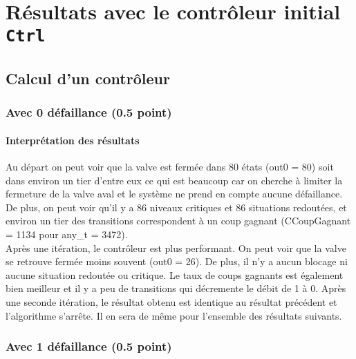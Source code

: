 \documentclass[a4paper]{book}
\begin{document}
\section{Résultats avec le contrôleur initial {\tt Ctrl}}
\subsection{Calcul d'un contrôleur}
\subsubsection{Avec 0 défaillance (0.5 point)}



%
%
\paragraph{Interprétation des résultats}
Au départ on peut voir que la valve est fermée dans 80 états (out0 = 80) 
soit dans environ un tier d'entre eux ce qui est beaucoup car on cherche à limiter la fermeture de la valve aval et le système ne prend en compte aucune défaillance. 
De plus, on peut voir qu'il y a 86 niveaux critiques et 86 situations redoutées, et environ un tier des transitions correspondent à un coup gagnant (CCoupGagnant = 1134 pour any\_t = 3472).\\
Après une itération, le contrôleur est plus performant. On peut voir que la valve se retrouve fermée moins souvent (out0 = 26). De plus, il n'y a aucun blocage 
ni aucune situation redoutée ou critique. Le taux de coups gagnants est également bien meilleur et il y a peu de transitions qui décremente le débit de 1 à 0.
Après une seconde itération, le résultat obtenu est identique au résultat précédent et l'algorithme s'arrête. Il en sera de même pour l'ensemble des résultats suivants.


\subsubsection{Avec 1 défaillance (0.5 point)}




%
\end{document}
